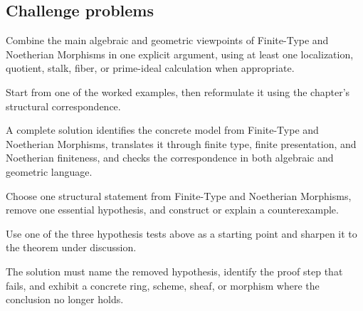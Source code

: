 \subsection*{Challenge problems}

\begin{exercise}\label{exr:vi26-expand-15}
Combine the main algebraic and geometric viewpoints of Finite-Type and Noetherian Morphisms in one explicit argument, using at least one localization, quotient, stalk, fiber, or prime-ideal calculation when appropriate.
\end{exercise}
\begin{hint}
Start from one of the worked examples, then reformulate it using the chapter's structural correspondence.
\end{hint}
\begin{solution}
A complete solution identifies the concrete model from Finite-Type and Noetherian Morphisms, translates it through finite type, finite presentation, and Noetherian finiteness, and checks the correspondence in both algebraic and geometric language.
\end{solution}

\begin{exercise}\label{exr:vi26-expand-16}
Choose one structural statement from Finite-Type and Noetherian Morphisms, remove one essential hypothesis, and construct or explain a counterexample.
\end{exercise}
\begin{hint}
Use one of the three hypothesis tests above as a starting point and sharpen it to the theorem under discussion.
\end{hint}
\begin{solution}
The solution must name the removed hypothesis, identify the proof step that fails, and exhibit a concrete ring, scheme, sheaf, or morphism where the conclusion no longer holds.
\end{solution}

